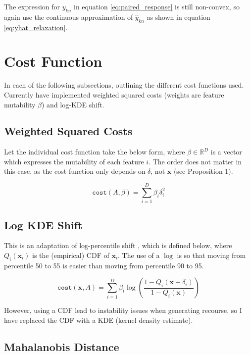 The expression for $y_{kn}$ in equation \ref{eq:paired_response} is still non-convex, so again use the continuous approximation of $\hat{y}_{kn}$ as shown in equation \ref{eq:yhat_relaxation}.

\section{Cost Function}
In each of the following subsections, outlining the different cost functions used. Currently have implemented weighted squared costs (weights are feature mutability $\beta$) and log-KDE shift.

\subsection{Weighted Squared Costs}

Let the individual cost function take the below form, where $\beta \in \mathbb{R}^D$ is a vector which expresses the mutability of each feature $i$. The order does not matter in this case, as the cost function only depends on $\delta$, not $\mathbf{x}$ (see Proposition 1).

\begin{equation}
	\texttt{cost}(A, \beta) = \sum_{i=1}^D \beta_i \delta^2_i
\end{equation}

\subsection{Log KDE Shift}

This is an adaptation of log-percentile shift \citep{ustunActionableRecourseLinear2019}, which is defined below, where $Q_i(\mathbf{x}_i)$ is the (empirical) CDF of $\mathbf{x}_i$. The use of a $\log$ is so that moving from percentile 50 to 55 is easier than moving from percentile 90 to 95.

\begin{equation}
	\texttt{cost}(\mathbf{x}, A) = \sum_{i=1}^D \beta_i \log (\frac{1 - Q_i(\mathbf{x} + \delta_i)}{1 - Q_i(\mathbf{x})})
\end{equation}

However, using a CDF lead to instability issues when generating recourse, so I have replaced the CDF with a KDE (kernel density estimate).

\subsection{Mahalanobis Distance}
